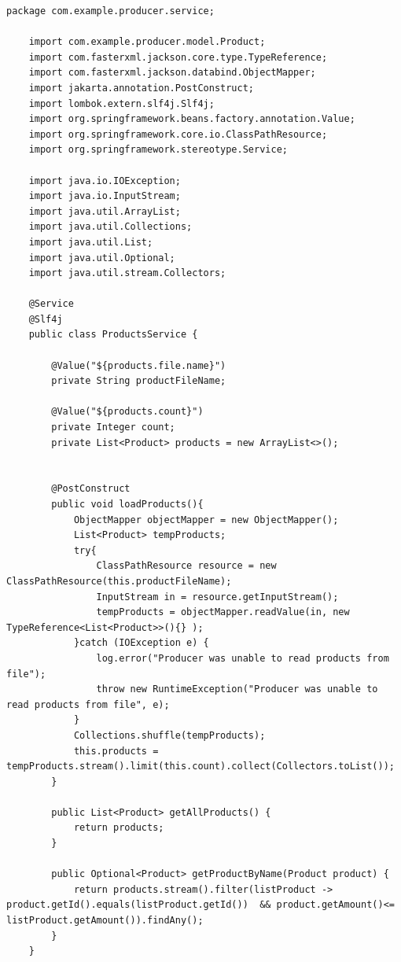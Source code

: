 \begin{lstlisting}[caption=Kod klasy ProductsService, label=productsServiceCode]
    package com.example.producer.service;

    import com.example.producer.model.Product;
    import com.fasterxml.jackson.core.type.TypeReference;
    import com.fasterxml.jackson.databind.ObjectMapper;
    import jakarta.annotation.PostConstruct;
    import lombok.extern.slf4j.Slf4j;
    import org.springframework.beans.factory.annotation.Value;
    import org.springframework.core.io.ClassPathResource;
    import org.springframework.stereotype.Service;
    
    import java.io.IOException;
    import java.io.InputStream;
    import java.util.ArrayList;
    import java.util.Collections;
    import java.util.List;
    import java.util.Optional;
    import java.util.stream.Collectors;
    
    @Service
    @Slf4j
    public class ProductsService {
    
        @Value("${products.file.name}")
        private String productFileName;
    
        @Value("${products.count}")
        private Integer count;
        private List<Product> products = new ArrayList<>();


        @PostConstruct
        public void loadProducts(){
            ObjectMapper objectMapper = new ObjectMapper();
            List<Product> tempProducts;
            try{
                ClassPathResource resource = new ClassPathResource(this.productFileName);
                InputStream in = resource.getInputStream();
                tempProducts = objectMapper.readValue(in, new TypeReference<List<Product>>(){} );
            }catch (IOException e) {
                log.error("Producer was unable to read products from file");
                throw new RuntimeException("Producer was unable to read products from file", e);
            }
            Collections.shuffle(tempProducts);
            this.products = tempProducts.stream().limit(this.count).collect(Collectors.toList());
        }

        public List<Product> getAllProducts() {
            return products;
        }

        public Optional<Product> getProductByName(Product product) {
            return products.stream().filter(listProduct ->  product.getId().equals(listProduct.getId())  && product.getAmount()<= listProduct.getAmount()).findAny();
        }
    }
\end{lstlisting}

